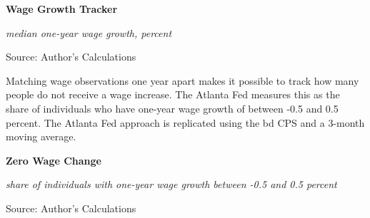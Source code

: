 \documentclass{report}
\makeatletter
\newcommand{\tbllink}[1]{\href{https://raw.githubusercontent.com/bdecon/US-chartbook/master/chartbook/data/#1}{\faTable}}
\newcommand*\short[1]{\expandafter\@gobbletwo\number\numexpr#1\relax}
\newcommand{\dateaxisticks}{
		date coordinates in=x, axis line style={draw=none},
		xmax={2020-08-10},
		max space between ticks=40,	    
		xtick={{1990-01-01}, {1992-01-01}, {1994-01-01}, 
			{1996-01-01}, {1998-01-01}, {2000-01-01}, 
			{2002-01-01}, {2004-01-01}, {2006-01-01},
			{2008-01-01}, {2010-01-01}, {2012-01-01}, {2014-01-01},
		    {2016-01-01}, {2018-01-01}, {2020-01-01}},
		minor xtick={{1989-01-01}, {1991-01-01}, {1993-01-01},
			{1995-01-01}, {1997-01-01}, {1999-01-01}, 
			{2001-01-01}, {2003-01-01}, {2005-01-01}, {2007-01-01},
		    {2009-01-01}, {2011-01-01}, {2013-01-01}, {2015-01-01},
		    {2017-01-01}, {2019-01-01}},
		enlarge y limits={0.06}, enlarge x limits={0.01},
		}
\newcommand{\bbar}[2]{extra #1 ticks = {{#2}}, extra #1 tick labels = ,
		extra #1 tick style = {grid=major, grid style={thick, black!25}},}
\newcommand{\stdline}[4]{\addplot[very thick, no markers, color=#1] 
		table [x=#2, y=#3, col sep=comma] {#4};	}
\newcommand{\thinline}[4]{\addplot[no markers, color=#1] 
		table [x=#2, y=#3, col sep=comma] {#4};	}
\newcommand{\rebars}{
		\fill[color=black!10] (axis cs:{2007-12-01},\pgfkeysvalueof{/pgfplots/ymin}) rectangle 
			(axis cs:{2009-07-01}, \pgfkeysvalueof{/pgfplots/ymax});
		\fill[color=black!10] (axis cs:{2001-03-01},\pgfkeysvalueof{/pgfplots/ymin}) rectangle 
			(axis cs:{2001-11-01}, \pgfkeysvalueof{/pgfplots/ymax});
		\fill[color=black!10] (axis cs:{2020-02-01},\pgfkeysvalueof{/pgfplots/ymin}) rectangle 
			(axis cs:{2020-09-01}, \pgfkeysvalueof{/pgfplots/ymax});}
\makeatother
\begin{document}
{{{{{{{{{\begin{minipage}{0.76\textwidth}
\normalsize \textbf{Wage Growth Tracker}

\footnotesize{\textit{median one-year wage growth, percent}}

\hspace*{-2mm} 

\footnotesize{Source: Author's Calculations} \hspace{59mm} \tbllink{atl_wgt.csv}




\vspace{16mm}

\small Matching wage observations one year apart makes it possible to track how many people do not receive a wage increase. The Atlanta Fed measures this as the share of individuals who have one-year wage growth of between -0.5 and 0.5 percent. The Atlanta Fed approach is replicated using the bd CPS and a 3-month moving average. 

\vspace{3mm}

\normalsize \textbf{Zero Wage Change}

\footnotesize{\textit{share of individuals with one-year wage growth between -0.5 and 0.5 percent}}

\hspace*{-2mm} 

\footnotesize{Source: Author's Calculations} \hspace{59mm} \tbllink{atl_wgt.csv}



\end{minipage}


}}}}}}}}}
\end{document}
